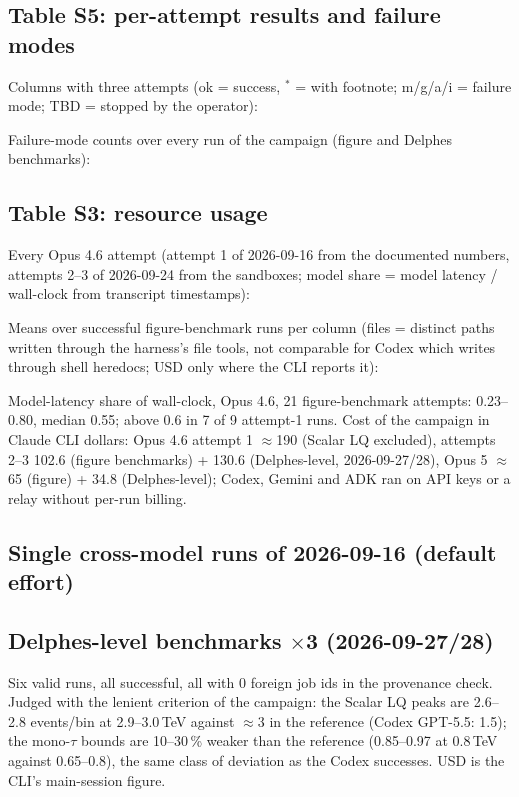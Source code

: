 \documentclass[10pt,a4paper]{article}
\newcommand{\wide}[1]{\noindent\resizebox{\textwidth}{!}{#1}}
\begin{document}
\subsection{Table S5: per-attempt results and failure modes}
Columns with three attempts (ok = success, $^{*}$ = with footnote; m/g/a/i = failure mode; TBD = stopped by the operator):

\begin{center}\small\end{center}

Failure-mode counts over every run of the campaign (figure and Delphes benchmarks):

\begin{center}\small\end{center}

\subsection{Table S3: resource usage}
Every Opus 4.6 attempt (attempt 1 of 2026-09-16 from the documented numbers, attempts 2--3 of 2026-09-24 from the sandboxes; model share = model latency / wall-clock from transcript timestamps):

\wide{}

Means over successful figure-benchmark runs per column (files = distinct paths written through the harness's file tools, not comparable for Codex which writes through shell heredocs; USD only where the CLI reports it):

\wide{}

Model-latency share of wall-clock, Opus 4.6, 21 figure-benchmark attempts: 0.23--0.80, median 0.55; above 0.6 in 7 of 9 attempt-1 runs. Cost of the campaign in Claude CLI dollars: Opus 4.6 attempt 1 $\approx$190 (Scalar LQ excluded), attempts 2--3 102.6 (figure benchmarks) + 130.6 (Delphes-level, 2026-09-27/28), Opus 5 $\approx$65 (figure) + 34.8 (Delphes-level); Codex, Gemini and ADK ran on API keys or a relay without per-run billing.

\subsection{Single cross-model runs of 2026-09-16 (default effort)}
\wide{}

\subsection{Delphes-level benchmarks $\times$3 (2026-09-27/28)}
Six valid runs, all successful, all with 0 foreign job ids in the provenance check. Judged with the lenient criterion of the
campaign: the Scalar LQ peaks are 2.6--2.8 events/bin at 2.9--3.0\,TeV against $\approx$3 in the reference (Codex GPT-5.5: 1.5);
the mono-$\tau$ bounds are 10--30\,\% weaker than the reference (0.85--0.97 at 0.8\,TeV against 0.65--0.8), the same class of
deviation as the Codex successes. USD is the CLI's main-session figure.
\end{document}
